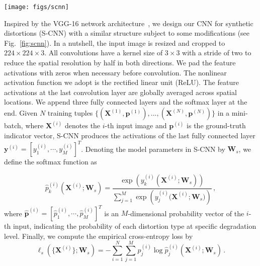 \documentclass[journal]{IEEEtran}
\begin{document}
\begin{figure*}[t]
  \centering
  \texttt{[image: figs/scnn]}
  \caption{The architecture of S-CNN  for synthetic distortions. We follow the style and convention in~\cite{BalleLS16a}, and denote the parameterization of the convolution layer as ``height $\times$ width $\mid$ input channel $\times$ output channel $\mid$ stride $\mid$ padding''. For brevity, we ignore all ReLU layers here.}\label{fig:scnn}
\end{figure*}

Inspired by the VGG-16 network architecture~\cite{simonyan2014very}, we design our CNN for synthetic distortions (S-CNN) with a similar structure subject to some modifications (see Fig.~\ref{fig:scnn}). In a nutshell, the input image is resized and cropped to $224 \times 224\times 3$. All convolutions have a kernel size of $3\times3$ with a stride of two to reduce the spatial resolution by half in both directions.
We pad the feature activations with zeros when necessary before convolution. The nonlinear activation function we adopt is the rectified linear unit (ReLU).
The feature activations at the last convolution layer are globally averaged across spatial locations. We append three fully connected layers and the softmax layer at the end. Given $N$ training tuples ${\{(\mathbf{X}^{(1)},\mathbf{p}^{(1)}),...,(\mathbf{X}^{(N)},\mathbf{p}^{(N)})\}}$ in a mini-batch, where $\mathbf{X}^{(i)}$ denotes the $i$-th input image and $\mathbf{p}^{(i)}$ is the ground-truth indicator vector, S-CNN produces the activations of the last fully connected layer $\mathbf{y}^{(i)} = [y^{(i)}_1,\cdots, y^{(i)}_{M}]^T$. Denoting the model parameters in S-CNN by $\mathbf{W}_s$, we define the softmax function as



\begin{equation}\label{eq:softmax}
\hat{p}^{(i)}_k(\mathbf{X}^{(i)};\mathbf{W}_s) = \frac{\exp\left({y^{(i)}_k(\mathbf{X}^{(i)};\mathbf{W}_s)}\right)}{\sum_{j=1}^{M}\exp\left({y^{(i)}_j(\mathbf{X}^{(i)};\mathbf{W}_s})\right)}\,,
\end{equation}
where $\hat{\mathbf{p}}^{(i)} = [\hat{p}^{(i)}_1,\cdots, \hat{p}^{(i)}_{M}]^T$ is an $M$-dimensional probability vector of the $i$-th input, indicating the probability of each distortion type at specific degradation level. Finally, we compute the empirical cross-entropy loss by
\begin{equation}\label{eq:cross_entropy}
\ell_s(\{\mathbf{X}^{(i)}\};\mathbf{W}_s) = -\sum_{i = 1}^{N}\sum_{j = 1}^{M}p^{(i)}_j\log \hat{p}^{(i)}_j(\mathbf{X}^{(i)};\mathbf{W}_s)\,.
\end{equation}
\end{document}
